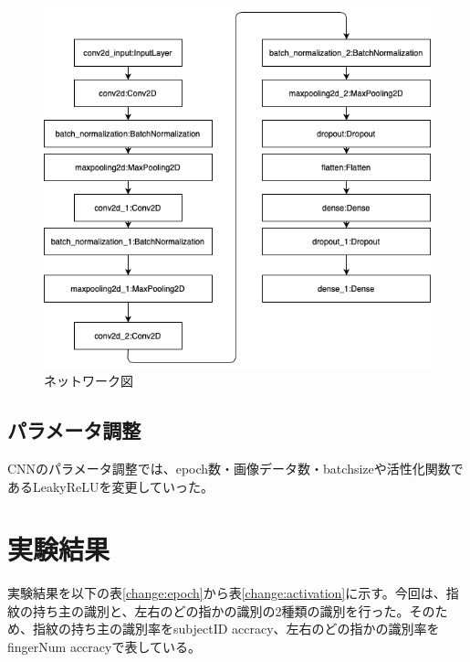 \documentclass[a4paper, 11pt, titlepage]{jsarticle}
\begin{document}
\begin{figure}
 \centering
  \includegraphics[scale=0.5]{model.png}
  \caption{ネットワーク図}
  \label{cnn3}
\end{figure}

\clearpage
\subsection{パラメータ調整}
CNNのパラメータ調整では、epoch数・画像データ数・batchsizeや活性化関数であるLeakyReLUを変更していった。


\section{実験結果}

実験結果を以下の表\ref{change:epoch}から表\ref{change:activation}に示す。今回は、指紋の持ち主の識別と、左右のどの指かの識別の2種類の識別を行った。そのため、指紋の持ち主の識別率をsubjectID accracy、左右のどの指かの識別率をfingerNum accracyで表している。
\end{document}
